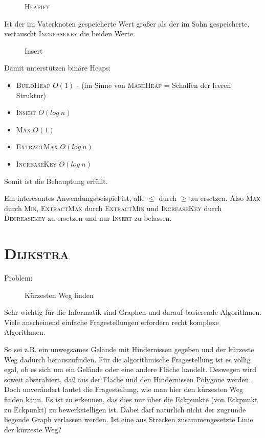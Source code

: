 \begin{figure}[H]
  \centering
  \caption{\textsc{Heapify}}
  \label{121103a}
\end{figure}
Ist der im Vaterknoten gespeicherte Wert größer als der im Sohn gespeicherte, vertauscht  \textsc{Increasekey} die beiden Werte.

\begin{figure}[H]
  \centering
  \caption{Insert}
  \label{121103b}
\end{figure}

Damit unterstützen binäre Heaps:
\begin{itemize}
\item \textsc{BuildHeap} $O(1)$ - (im Sinne von \textsc{MakeHeap} = Schaffen der leeren Struktur)
\item \textsc{Insert} $O(log\ n)$
\item \textsc{Max} $O(1)$
\item \textsc{ExtractMax} $O(log\ n)$
\item \textsc{IncreaseKey} $O(log\ n)$
\end{itemize}
Somit ist die Behauptung erfüllt.

Ein interesantes Anwendungsbeispiel ist, alle $\leq$ durch $\geq$ zu ersetzen. Also \textsc{Max} durch \textsc{Min},
\textsc{ExtractMax} durch \textsc{ExtractMin} und \textsc{IncreaseKey} durch \textsc{Decreasekey} zu ersetzen und nur \textsc{Insert}
zu belassen.

\section{\textsc{Dijkstra}}

 Problem:
\begin{figure}[H]
  \centering
  \caption{Kürzesten Weg finden}
  \label{121103c}
\end{figure}

Sehr wichtig für die Informatik sind Graphen und darauf basierende Algorithmen. Viele anscheinend einfache Fragestellungen erfordern
recht komplexe Algorithmen.

So sei z.B. ein unwegsames Gelände mit Hindernissen gegeben und der kürzeste Weg dadurch herauszufinden. Für die algorithmische
Fragestellung ist es völlig egal, ob es sich um ein Gelände oder eine andere Fläche handelt. Deswegen wird soweit abstrahiert, daß
aus der Fläche und den Hindernissen Polygone werden. Doch unverändert lautet die Fragestellung, wie man hier den kürzesten Weg
finden kann. Es ist zu erkennen, das dies nur über die Eckpunkte (von Eckpunkt zu Eckpunkt)
zu bewerkstelligen ist. Dabei darf natürlich nicht der zugrunde liegende Graph verlassen werden. Ist eine aus Strecken zusammengesetzte
Linie der kürzeste Weg?

